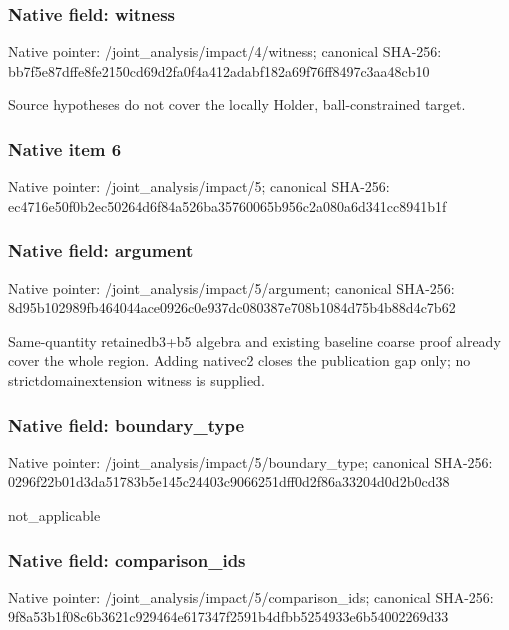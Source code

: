 \documentclass[10pt,a4paper]{article}
\begin{document}
\subsubsection{Native field: witness}
Native pointer: /joint\_\allowbreak{}analysis/impact/4/witness; canonical SHA-256: bb7f5e87dffe8fe2150cd69d2fa0f4a412adabf182a69f76ff8497c3aa48cb10

\begingroup\raggedright\sloppy Source hypotheses do not cover the locally Holder,\allowbreak{} ball-constrained target.\par\endgroup

\subsubsection{Native item 6}
Native pointer: /joint\_\allowbreak{}analysis/impact/5; canonical SHA-256: ec4716e50f0b2ec50264d6f84a526ba35760065b956c2a080a6d341cc8941b1f

\subsubsection{Native field: argument}
Native pointer: /joint\_\allowbreak{}analysis/impact/5/argument; canonical SHA-256: 8d95b102989fb464044ace0926c0e937dc080387e708b1084d75b4b88d4c7b62

\begingroup\raggedright\sloppy Same-quantity retainedb3+b5 algebra and existing baseline coarse proof already cover the whole region. Adding nativec2 closes the publication gap only;\allowbreak{} no strictdomainextension witness is supplied.\par\endgroup

\subsubsection{Native field: boundary\_\allowbreak{}type}
Native pointer: /joint\_\allowbreak{}analysis/impact/5/boundary\_\allowbreak{}type; canonical SHA-256: 0296f22b01d3da51783b5e145c24403c9066251dff0d2f86a33204d0d2b0cd38

\begingroup\raggedright\sloppy not\_\allowbreak{}applicable\par\endgroup

\subsubsection{Native field: comparison\_\allowbreak{}ids}
Native pointer: /joint\_\allowbreak{}analysis/impact/5/comparison\_\allowbreak{}ids; canonical SHA-256: 9f8a53b1f08c6b3621c929464e617347f2591b4dfbb5254933e6b54002269d33
\end{document}
